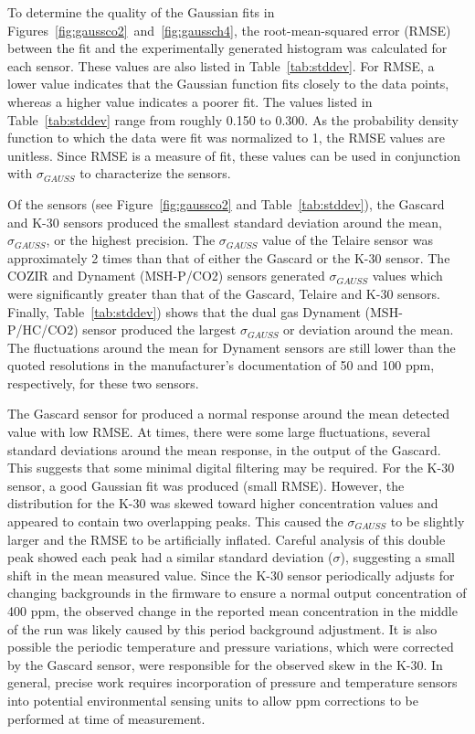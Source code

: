 \documentclass[sensors,article,submit,moreauthors,pdftex]{Definitions/mdpi}
\begin{document}
			To determine the quality of the Gaussian fits in Figures~\ref{fig:gaussco2}~and~\ref{fig:gaussch4}, the root-mean-squared error (RMSE) between the fit and the experimentally generated histogram was calculated for each sensor.
			These values are also listed in Table~\ref{tab:stddev}.
			For RMSE, a lower value indicates that the Gaussian function fits closely to the data points, whereas a higher value indicates a poorer fit.
			The values listed in Table~\ref{tab:stddev} range from roughly 0.150 to 0.300.
			As the probability density function to which the data were fit was normalized to 1, the RMSE values are unitless.
			Since RMSE is a measure of fit, these values can be used in conjunction with $\sigma_{GAUSS}$ to characterize the sensors.
			
			
			Of the  sensors (see Figure~\ref{fig:gaussco2} and Table~\ref{tab:stddev}), the Gascard and K-30 sensors produced the smallest standard deviation around the mean, $\sigma_{GAUSS}$, or the highest precision.
			The $\sigma_{GAUSS}$ value of the Telaire sensor was approximately 2 times than that of either the Gascard or the K-30 sensor.
			The COZIR and Dynament (MSH-P/CO2) sensors generated $\sigma_{GAUSS}$ values which were significantly greater than that of the Gascard, Telaire and K-30 sensors.
			Finally, Table~\ref{tab:stddev}) shows that the dual gas Dynament (MSH-P/HC/CO2) sensor produced the largest $\sigma_{GAUSS}$ or deviation around the mean.
			The fluctuations around the mean for Dynament sensors are still lower than the quoted resolutions in the manufacturer's documentation of 50 and 100 ppm, respectively, for these two sensors.
			
			The Gascard sensor for  produced a normal response around the mean detected value with low RMSE.
			At times, there were some large fluctuations, several standard deviations around the mean response, in the output of the Gascard.
			This suggests that some minimal digital filtering may be required.
			For the K-30 sensor, a good Gaussian fit was produced (small RMSE).
			However, the distribution for the K-30 was skewed toward higher concentration values and appeared to contain two overlapping peaks.
			This caused the $\sigma_{GAUSS}$ to be slightly larger and the RMSE to be artificially inflated.
			Careful analysis of this double peak showed each peak had a similar standard deviation ($\sigma$), suggesting a small shift in the mean measured value.
			Since the K-30 sensor periodically adjusts for changing backgrounds in the firmware to ensure a normal output concentration of 400 ppm, the observed change in the reported mean concentration in the middle of the run was likely caused by this period background adjustment.
			It is also possible the periodic temperature and pressure variations, which were corrected by the Gascard sensor, were responsible for the observed skew in the K-30.
			In general, precise work requires incorporation of pressure and temperature sensors into potential environmental sensing units to allow ppm corrections to be performed at time of measurement.
			
\end{document}
